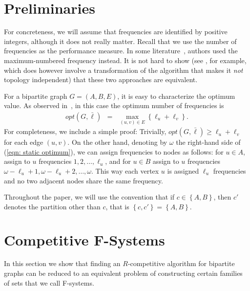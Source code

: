 \documentclass[11pt]{article}
\newcommand{\barell}{{\bar\ell}}
\newcommand{\braced}[1]{{ \left\{ #1 \right\} }}
\newcommand{\opt}{{\textit{opt}}}
\begin{document}
\section{Preliminaries}

For concreteness, we will assume that frequencies are identified by
positive integers, although it does not really matter.
Recall that we use the number of frequencies as the performance
measure. In some literature~\cite{ChCYZZ06,ChZhZh07,ChChYZ10},
authors used the maximum-numbered frequency instead. It is not hard to show
(see \cite{ChrSga10}, for example, which does however involve a transformation
of the algorithm that makes it \emph{not} topology independent)
that these two approaches are equivalent.    

For a bipartite graph $G = (A,B,E)$, it is easy to characterize the
optimum value. As observed in~\cite{ChCYZZ06,ChrSga10}, in this case
the optimum number of frequencies is
\begin{eqnarray}
		\opt(G,\barell) &=& \max_{(u,v)\in E} \braced{ \ell_u + \ell_v }.
			\label{eqn: static optimum}
\end{eqnarray}
For completeness, we include a simple proof: Trivially,
$\opt(G,\barell) \ge \ell_u+\ell_v$ for each edge $(u,v)$. 
On the other hand, denoting by $\omega$ the right-hand side of
(\ref{eqn: static optimum}), we can assign frequencies to
nodes as follows: for $u\in A$, assign to $u$ frequencies
$1,2,\ldots,\ell_u$, and for $u\in B$ assign to $u$ frequencies
$\omega-\ell_u+1,\omega-\ell_u+2,\ldots,\omega$. This way each vertex $u$
is assigned $\ell_u$ frequencies and no two adjacent nodes
share the same frequency.

Throughout the paper, we will use the convention that
if $c\in\braced{A,B}$, then 
$c'$ denotes the partition other than $c$, that is 
$\braced{c,c'} = \braced{A,B}$.



\section{Competitive F-Systems}

In this section we show that finding an $R$-competitive algorithm
for bipartite graphs can be reduced to an equivalent problem of
constructing certain families of sets that we call F-systems.
\end{document}
